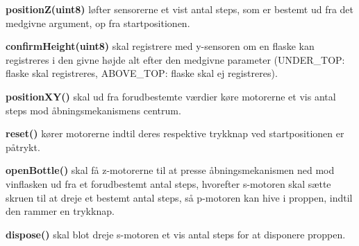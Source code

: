 
 \textbf{positionZ(uint8)} løfter sensorerne et vist antal steps, som er bestemt ud fra det medgivne argument, op fra startpositionen.

\textbf{confirmHeight(uint8)} skal registrere med y-sensoren om en flaske kan registreres i den givne højde alt efter den medgivne parameter (UNDER\_TOP: flaske skal registreres, ABOVE\_TOP: flaske skal ej registreres).

\textbf{positionXY()} skal ud fra forudbestemte værdier køre motorerne et vis antal steps mod åbningsmekanismens centrum.

\textbf{reset()} kører motorerne indtil deres  respektive trykknap ved startpositionen er påtrykt.

\textbf{openBottle()} skal få z-motorerne til at presse åbningsmekanismen ned mod vinflasken ud fra et forudbestemt antal steps, hvorefter s-motoren skal sætte skruen til at dreje et bestemt antal steps, så p-motoren kan hive i proppen, indtil den rammer en trykknap.

\textbf{dispose()} skal blot dreje s-motoren et vis antal steps for at disponere proppen.